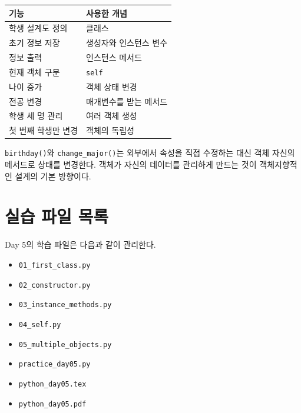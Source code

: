 \documentclass[11pt,a4paper]{article}
\begin{document}
\begin{center}
\begin{tabular}{ll}
\toprule
기능 & 사용한 개념 \\
\midrule
학생 설계도 정의 & 클래스 \\
초기 정보 저장 & 생성자와 인스턴스 변수 \\
정보 출력 & 인스턴스 메서드 \\
현재 객체 구분 & \texttt{self} \\
나이 증가 & 객체 상태 변경 \\
전공 변경 & 매개변수를 받는 메서드 \\
학생 세 명 관리 & 여러 객체 생성 \\
첫 번째 학생만 변경 & 객체의 독립성 \\
\bottomrule
\end{tabular}
\end{center}

\begin{importantbox}
\texttt{birthday()}와 \texttt{change\_major()}는 외부에서 속성을 직접 수정하는 대신 객체 자신의 메서드로 상태를 변경한다. 객체가 자신의 데이터를 관리하게 만드는 것이 객체지향적인 설계의 기본 방향이다.
\end{importantbox}

\section{실습 파일 목록}

\begin{practicebox}
Day 5의 학습 파일은 다음과 같이 관리한다.
\begin{itemize}[leftmargin=1.5em]
    \item \texttt{01\_first\_class.py}
    \item \texttt{02\_constructor.py}
    \item \texttt{03\_instance\_methods.py}
    \item \texttt{04\_self.py}
    \item \texttt{05\_multiple\_objects.py}
    \item \texttt{practice\_day05.py}
    \item \texttt{python\_day05.tex}
    \item \texttt{python\_day05.pdf}
\end{itemize}
\end{practicebox}
\end{document}
